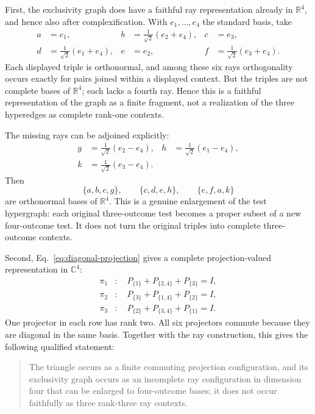 \documentclass[
  aps,
  pra,
  twocolumn,
  amsmath,
  amssymb,
  longbibliography,
  nofootinbib,
  floatfix
]{revtex4-2}
\begin{document}
First, the exclusivity graph does have a faithful ray representation already in
$\mathbb R^4$, and hence also after complexification.  With
$e_1,\ldots,e_4$ the standard basis, take
\begin{align}
 a&=e_1,& b&=\tfrac1{\sqrt2}(e_2+e_4),& c&=e_3,\nonumber\\
 d&=\tfrac1{\sqrt2}(e_1+e_4),& e&=e_2,&
 f&=\tfrac1{\sqrt2}(e_3+e_4).
 \label{eq:triangle-rays-four}
\end{align}
Each displayed triple is orthonormal, and among these six rays orthogonality
occurs exactly for pairs joined within a displayed context.  But the triples are
not complete bases of $\mathbb R^4$; each lacks a fourth ray.  Hence this is a
faithful representation of the graph as a finite fragment, not a realization
of the three hyperedges as complete rank-one contexts.

The missing rays can be adjoined explicitly:
\begin{equation}
\begin{aligned}
  g&=\tfrac1{\sqrt2}(e_2-e_4),&
  h&=\tfrac1{\sqrt2}(e_1-e_4),\\
  k&=\tfrac1{\sqrt2}(e_3-e_4).&&
\end{aligned}
  \label{eq:triangle-completing-rays}
\end{equation}
Then
\begin{equation}
 \{a,b,c,g\},\qquad \{c,d,e,h\},\qquad \{e,f,a,k\}
 \label{eq:triangle-completed-contexts}
\end{equation}
are orthonormal bases of $\mathbb R^4$.  This is a genuine enlargement of the
test hypergraph: each original three-outcome test becomes a proper subset of a
new four-outcome test.  It does not turn the original triples into complete
three-outcome contexts.

Second, Eq.~\eqref{eq:diagonal-projection} gives a complete projection-valued
representation in $\mathbb C^4$:
\begin{align}
 \pi_1&:\quad P_{\{1\}}+P_{\{2,4\}}+P_{\{3\}}=I,\nonumber\\
 \pi_2&:\quad P_{\{3\}}+P_{\{1,4\}}+P_{\{2\}}=I,\label{eq:triangle-pvms}\\
 \pi_3&:\quad P_{\{2\}}+P_{\{3,4\}}+P_{\{1\}}=I.\nonumber
\end{align}
One projector in each row has rank two.  All six projectors commute because
they are diagonal in the same basis.  Together with the ray construction, this
gives the following qualified statement:
\begin{quote}
The triangle occurs as a finite commuting projection configuration, and its
exclusivity graph occurs as an incomplete ray configuration in dimension four
that can be enlarged to four-outcome bases; it does not occur faithfully as
three rank-three ray contexts.
\end{quote}
\end{document}
